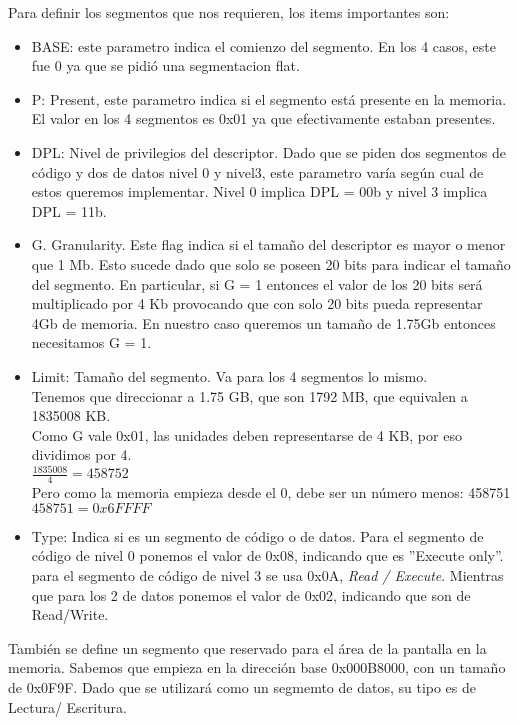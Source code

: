 Para definir los segmentos que nos requieren, los items importantes son:\\
\begin{itemize}
 \item BASE: este parametro indica el comienzo del segmento. En los 4 casos, este fue 0 ya que se pidió una segmentacion flat.
 \item P: Present, este parametro indica si el segmento est\'a presente en la memoria. El valor en los 4 segmentos es 0x01 ya que efectivamente estaban presentes.
 \item DPL: Nivel de privilegios del descriptor. Dado que se piden dos segmentos de código y dos de datos nivel 0 y nivel3, este 
parametro var\'ia seg\'un cual de estos queremos implementar. Nivel 0 implica DPL = 00b y nivel 3 implica DPL = 11b.
 \item G. Granularity. Este flag indica si el tamaño del descriptor es mayor o menor que 1 Mb. Esto sucede dado que solo se poseen 20 bits para 
indicar el tamaño del segmento. En particular, si G = 1 entonces el valor de los 20 bits ser\'a multiplicado por 4 Kb provocando que con 
 solo 20 bits pueda representar 4Gb de memoria. En nuestro caso queremos un tamaño de 1.75Gb entonces necesitamos G = 1.
 \item Limit: Tamaño del segmento. Va para los 4 segmentos lo mismo.\\
  \indent Tenemos que direccionar a 1.75 GB, que son 1792 MB, que equivalen a 1835008 KB.\\
  \indent Como G vale 0x01, las unidades deben representarse de 4 KB, por eso dividimos por 4.\\
  \indent $\frac{1835008}{4} = 458752$\\
  \indent Pero como la memoria empieza desde el 0, debe ser un n\'umero menos: 458751\\
  \indent $458751 = 0x6FFFF$
 \item Type: Indica si es un segmento de c\'odigo o de datos. Para el segmento de c\'odigo de nivel 0 ponemos el valor de 0x08, indicando 
que es ''Execute only''. para el segmento de c\'odigo de nivel 3 se usa 0x0A, \emph{Read / Execute}. Mientras que para los 2 de datos 
ponemos el valor de 0x02, indicando que son de Read/Write.
\end{itemize}


Tambi\'en se define un segmento que reservado para el \'area de la pantalla en la memoria. Sabemos que empieza en la direcci\'on base
0x000B8000, con un tamaño de 0x0F9F. Dado que se utilizar\'a como un segmemto de datos, su tipo es de Lectura/ Escritura.\\\\

